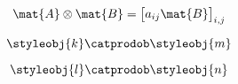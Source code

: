 \begin{forslides}
    \begin{equation}
        \label{eq:parallelism-041}
        \mat{A} \otimes \mat{B} = 
        \begin{bmatrix}
        a_{ij} \mat{B}
        \end{bmatrix}_{i,j}
    \end{equation}

    \begin{equation}
        \label{eq:parallelism-042}
         \styleobj{k} \catprodob \styleobj{m}
    \end{equation}

    \begin{equation}
        \label{eq:parallelism-043}
        \styleobj{l} \catprodob \styleobj{n}
    \end{equation}


\begin{comment}
    \begin{equation}
        \label{eq:parallelism-044}
        \Snacks\cartprod \Drinks
    \end{equation}

    \begin{equation}
        \label{eq:parallelism-045}
        \meal \colon \Participants\sto \Snacks\cartprod \Drinks
    \end{equation}

    \begin{equation}
        \label{eq:parallelism-046}
        \eats
    \end{equation}

    \begin{equation}
        \label{eq:parallelism-047}
        \drinks
    \end{equation}

    \begin{equation}
        \label{eq:parallelism-048}
        \catprodphi_{\eats,\drinks}
    \end{equation}

    \begin{equation}
        \label{eq:parallelism-049}
        \eats =\catprodphi_{\eats,\drinks}\mthen \proj_1
    \end{equation}

    \begin{equation}
        \label{eq:parallelism-050}
        \drinks=\catprodphi_{\eats,\drinks}\mthen \proj_2
    \end{equation}

    \begin{equation}
        \label{eq:parallelism-051}
        \Participants
    \end{equation}


\end{comment}
\end{forslides}
